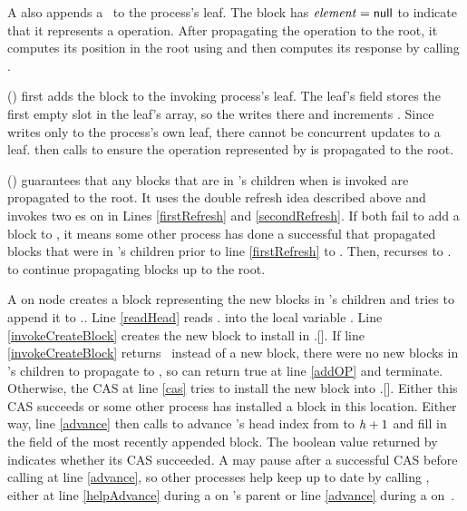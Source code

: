 A  also appends a \block\ to the process's leaf.
The block has $\mbox{\textit{element}}=\mbox{\sf null}$ to indicate that it represents a  operation.
After propagating the operation to the root, it computes
its position in the root using
 and then computes its response by calling . 

() first adds the block  to the invoking process's leaf.
The leaf's  field stores the first empty slot in the leaf's  array,
so the  writes  there and increments .
Since  writes only to the process's own leaf, there cannot be concurrent updates to a leaf.
 then calls  to ensure the operation represented by  is propagated to the root.

() guarantees that any blocks that are in 's children when  is invoked are propagated to the root.
It uses the double refresh idea described
above and invokes two es on  in Lines
\ref{firstRefresh} and \ref{secondRefresh}. 
If both fail to add a block to , it means some other process has done a successful 
that propagated blocks that were in 's children prior to line \ref{firstRefresh} to .
Then,  recurses to . to continue propagating blocks up to the root.  

A  on node  creates a block representing the new blocks
in 's
children and tries to append it to .. 
Line \ref{readHead} reads . into the local variable .
Line \ref{invokeCreateBlock} creates the new block to install in .[].
If line \ref{invokeCreateBlock} returns \nl\ instead of a new block, there were no new blocks in 's children to propagate to , so  can return true at line \ref{addOP} and terminate.
Otherwise, the CAS at line \ref{cas} tries to install the new block into .[].
Either this CAS succeeds or some other process has installed a  block in this location.
Either way, line \ref{advance} then calls  to advance 's head index 
from  to $\mbox{\textnormal{\textit{h}}}+1$
and fill in the  field of the most recently appended block.
The boolean value returned by  indicates whether its CAS succeeded.
A  may pause after a successful CAS before calling  at line \ref{advance},
so other processes help keep  up to date by  calling , 
either at line \ref{helpAdvance} during a  on 's parent or line \ref{advance} during a  on~.

